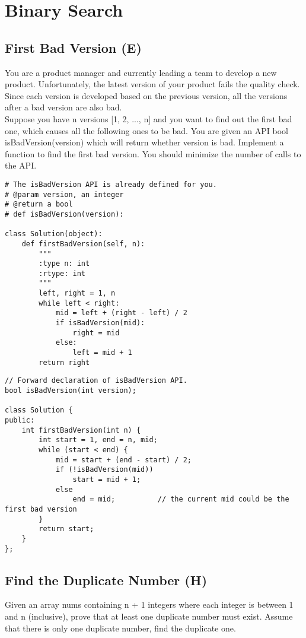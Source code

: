 \chapter{Binary Search}
\section{First Bad Version (E)}
You are a product manager and currently leading a team to develop a new product. Unfortunately, the latest version of your product fails the quality check. Since each version is developed based on the previous version, all the versions after a bad version are also bad.\\

Suppose you have n versions [1, 2, ..., n] and you want to find out the first bad one, which causes all the following ones to be bad. You are given an API bool isBadVersion(version) which will return whether version is bad. Implement a function to find the first bad version. You should minimize the number of calls to the API. \\

\begin{lstlisting}
# The isBadVersion API is already defined for you.
# @param version, an integer
# @return a bool
# def isBadVersion(version):

class Solution(object):
    def firstBadVersion(self, n):
        """
        :type n: int
        :rtype: int
        """
        left, right = 1, n
        while left < right:
            mid = left + (right - left) / 2
            if isBadVersion(mid):
                right = mid
            else:
                left = mid + 1
        return right
\end{lstlisting}

\begin{lstlisting}
// Forward declaration of isBadVersion API.
bool isBadVersion(int version);

class Solution {
public:
    int firstBadVersion(int n) {
        int start = 1, end = n, mid;
        while (start < end) {
            mid = start + (end - start) / 2;
            if (!isBadVersion(mid))
                start = mid + 1;
            else
                end = mid;          // the current mid could be the first bad version
        }
        return start;
    }
};
\end{lstlisting}


\section{Find the Duplicate Number (H)}
Given an array nums containing n + 1 integers where each integer is between 1 and n (inclusive), prove that at least one duplicate number must exist. Assume that there is only one duplicate number, find the duplicate one. \\

